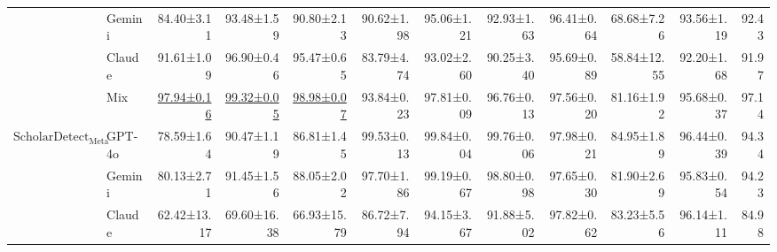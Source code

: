 \begin{table*}[t]
{\begin{tabular}{@{}l|p{1.3cm}|rrr|rrr|rrr|r@{}}
                                                                 & Gemini                             & 84.40\small ±3.11          & 93.48\small ±1.59          & 90.80\small ±2.13          & 90.62\small ±1.98          & 95.06\small ±1.21          & 92.93\small ±1.63          & 96.41\small ±0.64          & 68.68\small ±7.26          & 93.56\small ±1.19          & 92.43                                                 \\
                                                                 & Claude                             & 91.61\small ±1.09          & 96.90\small ±0.46          & 95.47\small ±0.65          & 83.79\small ±4.74          & 93.02\small ±2.60          & 90.25\small ±3.40          & 95.69\small ±0.89          & 58.84\small ±12.55         & 92.20\small ±1.68          & 91.97                                                 \\
                                                                 & Mix                                & \underline{97.94\small ±0.16}          & \underline{99.32\small ±0.05}          & \underline{98.98\small ±0.07}          & 93.84\small ±0.23          & 97.81\small ±0.09          & 96.76\small ±0.13          & 97.56\small ±0.20          & 81.16\small ±1.92          & 95.68\small ±0.37          & 97.14                                                 \\ \midrule
\multirow{4}{*}{\textbf{$\text{ScholarDetect}_{\text{Meta}}$}}   & GPT-4o                             & 78.59\small ±1.64          & 90.47\small ±1.19          & 86.81\small ±1.45          & 99.53\small ±0.13          & 99.84\small ±0.04          & 99.76\small ±0.06          & 97.98\small ±0.21          & 84.95\small ±1.89          & 96.44\small ±0.39          & 94.34                                                 \\
                                                                 & Gemini                             & 80.13\small ±2.71          & 91.45\small ±1.56          & 88.05\small ±2.02          & 97.70\small ±1.86          & 99.19\small ±0.67          & 98.80\small ±0.98          & 97.65\small ±0.30          & 81.90\small ±2.69          & 95.83\small ±0.54          & 94.23                                                 \\
                                                                 & Claude                             & 62.42\small ±13.17         & 69.60\small ±16.38         & 66.93\small ±15.79         & 86.72\small ±7.94          & 94.15\small ±3.67          & 91.88\small ±5.02          & 97.82\small ±0.62          & 83.23\small ±5.56          & 96.14\small ±1.11          & 84.98                                                 \\

\end{tabular}}
\end{table*}
